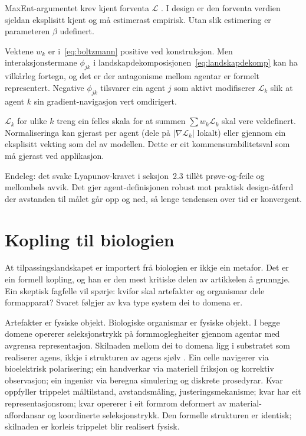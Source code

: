 \documentclass[10pt,a4paper,twocolumn]{article}
\begin{document}
MaxEnt-argumentet krev kjent forventa $\mathcal{L}$ \citep{jaynes1957}. I design er den forventa verdien sjeldan eksplisitt kjent og må estimerast empirisk. Utan slik estimering er parameteren $\beta$ udefinert.

Vektene $w_k$ er i~\ref{eq:boltzmann} positive ved konstruksjon. Men interaksjonstermane $\phi_{jk}$ i landskapdekomposisjonen~\ref{eq:landskapdekomp} kan ha vilkårleg fortegn, og det er der antagonisme mellom agentar er formelt representert. Negative $\phi_{jk}$ tilsvarer ein agent $j$ som aktivt modifiserer $\mathcal{L}_k$ slik at agent $k$ sin gradient-navigasjon vert omdirigert.

$\mathcal{L}_k$ for ulike $k$ treng ein felles skala for at summen $\sum w_k \mathcal{L}_k$ skal vere veldefinert. Normaliseringa kan gjerast per agent (dele på $|\nabla \mathcal{L}_k|$ lokalt) eller gjennom ein eksplisitt vekting som del av modellen. Dette er eit kommensurabilitetsval som må gjerast ved applikasjon.

Endeleg: det svake Lyapunov-kravet i seksjon~2.3 tillèt prøve-og-feile og mellombels avvik. Det gjer agent-definisjonen robust mot praktisk design-åtferd der avstanden til målet går opp og ned, så lenge tendensen over tid er konvergent.

\section{Kopling til biologien}

At tilpassingslandskapet er importert frå biologien er ikkje ein metafor. Det er ein formell kopling, og han er den mest kritiske delen av artikkelen å grunngje. Ein skeptisk fagfelle vil spørje: kvifor skal artefakter og organismar dele formapparat? Svaret følgjer av kva type system dei to domena er.

Artefakter er fysiske objekt. Biologiske organismar er fysiske objekt. I begge domene opererer seleksjonstrykk på formmoglegheiter gjennom agentar med avgrensa representasjon. Skilnaden mellom dei to domena ligg i substratet som realiserer agens, ikkje i strukturen av agens sjølv \citep{levin2022, fieldslevin2022}. Ein celle navigerer via bioelektrisk polarisering; ein handverkar via materiell friksjon og korrektiv observasjon; ein ingeniør via beregna simulering og diskrete prosedyrar. Kvar oppfyller trippelet måltilstand, avstandsmåling, justeringsmekanisme; kvar har eit representasjonsrom; kvar opererer i eit formrom deformert av material-affordansar og koordinerte seleksjonstrykk. Den formelle strukturen er identisk; skilnaden er korleis trippelet blir realisert fysisk.
\end{document}
